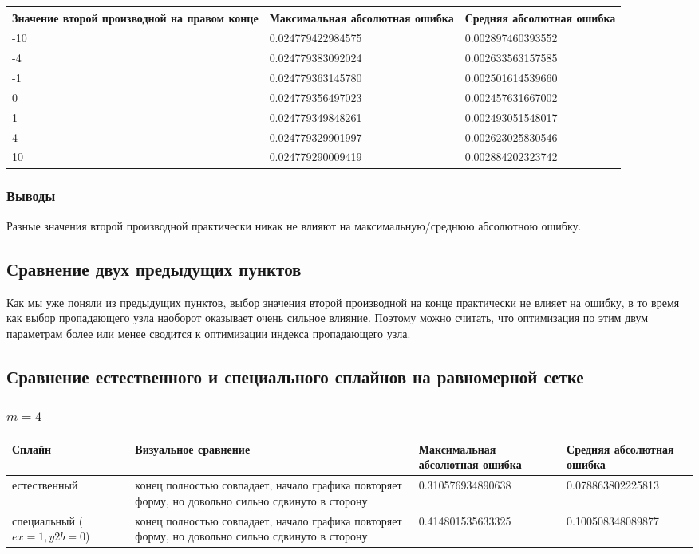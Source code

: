 \documentclass[paper=a4, fontsize=11pt]{scrartcl} %
\numberwithin{equation}{section} %
\numberwithin{figure}{section} %
\numberwithin{table}{section} %
\begin{document}
\begin{tabular}{|p{4 cm}|p{4 cm}|p{4 cm}|}
\hline
	Значение второй производной на правом конце & Максимальная абсолютная ошибка & Средняя абсолютная ошибка\\
\hline
	-10 & 0.024779422984575 & 0.002897460393552\\
\hline
	-4 & 0.024779383092024 & 0.002633563157585\\
\hline
	-1 & 0.024779363145780 & 0.002501614539660\\
\hline
	0 & 0.024779356497023 & 0.002457631667002 \\
\hline
	1 & 0.024779349848261 & 0.002493051548017\\
\hline
	4 & 0.024779329901997 & 0.002623025830546\\
\hline
	10 & 0.024779290009419 & 0.002884202323742\\
\hline
\end{tabular}

\subsubsection{Выводы}

Разные значения второй производной практически никак не влияют на максимальную/среднюю абсолютною ошибку.

\subsection{Сравнение двух предыдущих пунктов}

Как мы уже поняли из предыдущих пунктов, выбор значения второй производной на конце практически не влияет на ошибку, в то время как выбор пропадающего узла наоборот оказывает очень сильное влияние. Поэтому можно считать, что оптимизация по этим двум параметрам более или менее сводится к оптимизации индекса пропадающего узла.

\subsection{Сравнение естественного и специального сплайнов на равномерной сетке}

\subsubsection{$m=4$}

\begin{tabular}{|p{4 cm}|p{4 cm}|p{4 cm}|p{4 cm}|}
\hline
	Сплайн & Визуальное сравнение & Максимальная абсолютная ошибка & Средняя абсолютная ошибка\\
\hline
	естественный & конец полностью совпадает, начало графика повторяет форму, но довольно сильно сдвинуто в сторону & 0.310576934890638 & 0.078863802225813\\
\hline
	специальный ($ex=1,y2b=0$) & конец полностью совпадает, начало графика повторяет форму, но довольно сильно сдвинуто в сторону & 0.414801535633325 & 0.100508348089877\\
\hline
\end{tabular}
\end{document}
